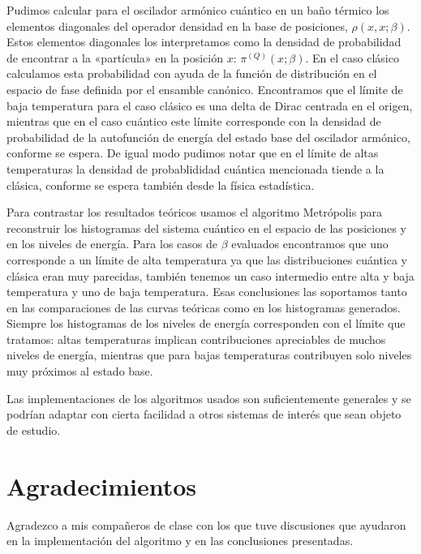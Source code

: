 \documentclass[%
 reprint,
 amsmath,amssymb,
 aps,
 pra,
]{revtex4-2}
\begin{document}
Pudimos calcular para el oscilador armónico cuántico en un baño térmico los elementos diagonales del operador densidad en la base de posiciones, $\rho(x,x;\beta)$. Estos elementos diagonales los interpretamos como la densidad de probabilidad de encontrar a la «partícula» en la posición $x$: $\pi^{(Q)}(x;\beta)$. En el caso clásico calculamos esta probabilidad con ayuda de la función de distribución en el espacio de fase definida por el ensamble canónico. Encontramos que el límite de baja temperatura para el caso clásico es una delta de Dirac centrada en el origen, mientras que en el caso cuántico este límite corresponde con la densidad de probabilidad de la autofunción de energía del estado base del oscilador armónico, conforme se espera. De igual modo pudimos notar que en el límite de altas temperaturas la densidad de probablididad cuántica mencionada tiende a la clásica, conforme se espera también desde la física estadística. 

Para contrastar los resultados teóricos usamos el algoritmo Metrópolis para reconstruir los histogramas del sistema cuántico en el espacio de las posiciones y en los niveles de energía. Para los casos de $\beta$ evaluados encontramos que uno corresponde a un límite de alta temperatura ya que las distribuciones cuántica y clásica eran muy parecidas, también tenemos un caso intermedio entre alta y baja temperatura y uno de baja temperatura. Esas conclusiones las soportamos tanto en las comparaciones de las curvas teóricas como en los histogramas generados. Siempre los histogramas de los niveles de energía corresponden con el límite que tratamos: altas temperaturas implican contribuciones apreciables de muchos niveles de energía, mientras que para bajas temperaturas contribuyen solo niveles muy próximos al estado base.

Las implementaciones de los algoritmos usados son suficientemente generales y se podrían adaptar con cierta facilidad a otros sistemas de interés que sean objeto de estudio.

\section*{Agradecimientos}
Agradezco a mis compañeros de clase con los que tuve discusiones que ayudaron en la implementación del algoritmo y en las conclusiones presentadas. 

\nocite{*}

\end{document}

